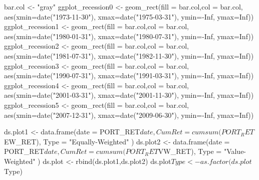 \begin{Schunk}
\begin{Sinput}
bar.col <- "gray"
ggplot_recession0 <- geom_rect(fill = bar.col,col = bar.col,
                               aes(xmin=date("1973-11-30"), 
                                   xmax=date("1975-03-31"), 
                                   ymin=-Inf, ymax=Inf))
ggplot_recession1 <- geom_rect(fill = bar.col,col = bar.col,
                               aes(xmin=date("1980-01-31"),
                                   xmax=date("1980-07-31"),
                                   ymin=-Inf, ymax=Inf))
ggplot_recession2 <- geom_rect(fill = bar.col,col = bar.col,
                               aes(xmin=date("1981-07-31"), 
                                   xmax=date("1982-11-30"), 
                                   ymin=-Inf, ymax=Inf))
ggplot_recession3 <- geom_rect(fill = bar.col,col = bar.col,
                               aes(xmin=date("1990-07-31"), 
                                   xmax=date("1991-03-31"), 
                                   ymin=-Inf, ymax=Inf))
ggplot_recession4 <- geom_rect(fill = bar.col,col = bar.col,
                               aes(xmin=date("2001-03-31"), 
                                   xmax=date("2001-11-30"), 
                                   ymin=-Inf, ymax=Inf))
ggplot_recession5 <- geom_rect(fill = bar.col,col = bar.col,
                               aes(xmin=date("2007-12-31"), 
                                   xmax=date("2009-06-30"), 
                                   ymin=-Inf, ymax=Inf))

ds.plot1 <- data.frame(date = PORT_RET$date, CumRet =  cumsum(PORT_RET$EW_RET),
                       Type = "Equally-Weighted" )
ds.plot2 <- data.frame(date = PORT_RET$date, CumRet =  cumsum(PORT_RET$VW_RET),
                       Type = "Value-Weighted" )
ds.plot <- rbind(ds.plot1,ds.plot2)
ds.plot$Type <- as.factor(ds.plot$Type)


\end{Sinput}
\end{Schunk}
